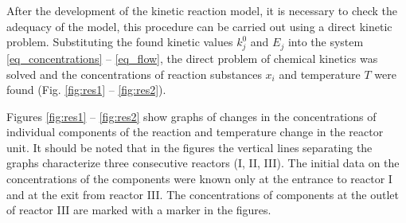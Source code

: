 \documentclass[mathematics,article,submit,pdftex,moreauthors]{Definitions/mdpi}
\begin{document}

After the development of the kinetic reaction model, it is necessary to check the adequacy of the model, this procedure can be carried out using a direct kinetic problem. Substituting the found kinetic values $k_j^0$ and $E_j$ into the system \eqref{eq_concentrations} -- \eqref{eq_flow}, the direct problem of chemical kinetics was solved and the concentrations of reaction substances $x_i$ and temperature $T$ were found (Fig. \ref{fig:res1} -- \ref{fig:res2}).

Figures \ref{fig:res1} -- \ref{fig:res2} show graphs of changes in the concentrations of individual components of the reaction and temperature change in the reactor unit. It should be noted that in the figures the vertical lines separating the graphs characterize three consecutive reactors (I, II, III).  The initial data on the concentrations of the components were known only at the entrance to reactor I and at the exit from reactor III. The concentrations of components at the outlet of reactor III are marked with a marker in the figures.
\end{document}
